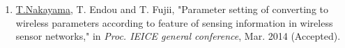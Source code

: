 \begin{publication}
  \begin{enumerate}[{}i{.}]
  \item \underline{T.Nakayama}, T. Endou and T. Fujii, 
    "Parameter setting of converting to wireless parameters according to feature of sensing information in wireless sensor networks," 
    in {\it Proc. IEICE general conference}, Mar. 2014 (Accepted). 
  \end{enumerate}
\end{publication}

